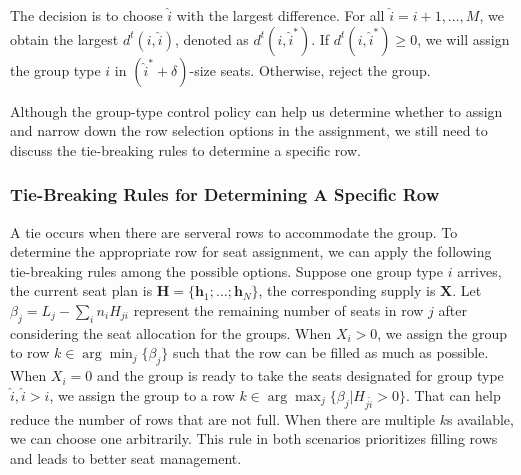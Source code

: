 The decision is to choose $\hat{i}$ with the largest difference. For all $\hat{i} = {i}+1, \ldots, M$, we obtain the largest $d^{t}({i},\hat{i})$, denoted as $d^{t}({i},\hat{i}^{*})$. If $d^{t}({i},\hat{i}^{*}) \geq 0$, we will assign the group type ${i}$ in $(\hat{i}^{*}+\delta)$-size seats. Otherwise, reject the group.

Although the group-type control policy can help us determine whether to assign and narrow down the row selection options in the assignment, we still need to discuss the tie-breaking rules to determine a specific row.

\subsubsection{Tie-Breaking Rules for Determining A Specific Row}\label{tie-break}
A tie occurs when there are serveral rows to accommodate the group. To determine the appropriate row for seat assignment, we can apply the following tie-breaking rules among the possible options. Suppose one group type ${i}$ arrives, the current seat plan is $\bm{H} = \{\bm{h}_{1}; \ldots; \bm{h}_{N}\}$, the corresponding supply is $\bm{X}$. Let $\beta_{j} = L_j - \sum_{i} n_{i} H_{ji}$ represent the remaining number of seats in row $j$ after considering the seat allocation for the groups. When $X_{i} > 0$, we assign the group to row $k \in \arg \min_{j} \{\beta_{j}\}$ such that the row can be filled as much as possible. When $X_{i} = 0$ and the group is ready to take the seats designated for group type $\hat{i}, \hat{i}>i$, we assign the group to a row $k \in \arg \max_{j} \{\beta_{j}| H_{j \hat{i}}>0\}$. That can help reduce the number of rows that are not full. When there are multiple $k$s available, we can choose one arbitrarily. This rule in both scenarios prioritizes filling rows and leads to better seat management.


